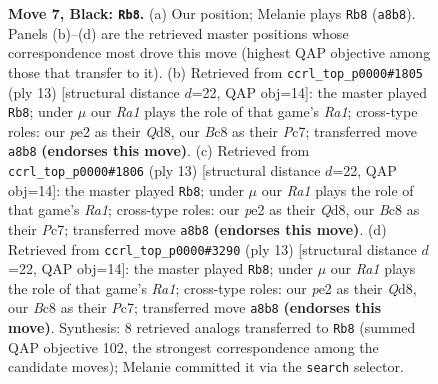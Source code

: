 \documentclass[11pt]{article}
\begin{document}
\begin{figure}[p]
\caption{\textbf{Move 7, Black: \texttt{Rb8}.} (a) Our position; Melanie plays \texttt{Rb8} (\texttt{a8b8}). Panels (b)--(d) are the retrieved master positions whose correspondence most drove this move (highest QAP objective among those that transfer to it). (b) Retrieved from \texttt{ccrl\_top\_p0000\#1805} (ply 13) [structural distance $d$=22, QAP obj=14]: the master played \texttt{Rb8}; under $\mu$ our \emph{Ra1} plays the role of that game's \emph{Ra1}; cross-type roles: our \emph{p}e2 as their \emph{Q}d8, our \emph{B}c8 as their \emph{P}c7; transferred move \texttt{a8b8} \textbf{(endorses this move)}. (c) Retrieved from \texttt{ccrl\_top\_p0000\#1806} (ply 13) [structural distance $d$=22, QAP obj=14]: the master played \texttt{Rb8}; under $\mu$ our \emph{Ra1} plays the role of that game's \emph{Ra1}; cross-type roles: our \emph{p}e2 as their \emph{Q}d8, our \emph{B}c8 as their \emph{P}c7; transferred move \texttt{a8b8} \textbf{(endorses this move)}. (d) Retrieved from \texttt{ccrl\_top\_p0000\#3290} (ply 13) [structural distance $d$=22, QAP obj=14]: the master played \texttt{Rb8}; under $\mu$ our \emph{Ra1} plays the role of that game's \emph{Ra1}; cross-type roles: our \emph{p}e2 as their \emph{Q}d8, our \emph{B}c8 as their \emph{P}c7; transferred move \texttt{a8b8} \textbf{(endorses this move)}. Synthesis: 8 retrieved analogs transferred to \texttt{Rb8} (summed QAP objective 102, the strongest correspondence among the candidate moves); Melanie committed it via the \texttt{search} selector.}
\label{fig:thought-m13}
\end{figure}

\clearpage
\end{document}
